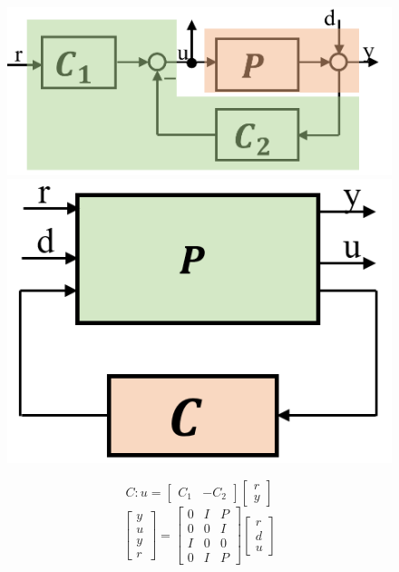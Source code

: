 \begin{figure}[h!]
	\centering
	\begin{minipage}{0.25\linewidth}
		\includegraphics[width=1\linewidth]{bilder/LFT3}
	\end{minipage}
	\begin{minipage}{0.25\linewidth}
		\includegraphics[width=.75\linewidth]{bilder/LFT4}
	\end{minipage}
	\begin{minipage}{0.45\linewidth}
		\footnotesize
			\begin{equation*}
		C: u = \begin{bmatrix}
		C_1 & -C_2
		\end{bmatrix} \begin{bmatrix}
		r\\y
		\end{bmatrix}				
		\end{equation*}
		\begin{equation*}
		\begin{bmatrix}
		y\\u\\y\\r
		\end{bmatrix} = \begin{bmatrix}
		0 & I & P\\
		0 & 0 & I\\
		I & 0 & 0\\
		0 & I & P
		\end{bmatrix}\begin{bmatrix}
		r\\d\\u
		\end{bmatrix}
		\end{equation*}
	\end{minipage}
\end{figure}


